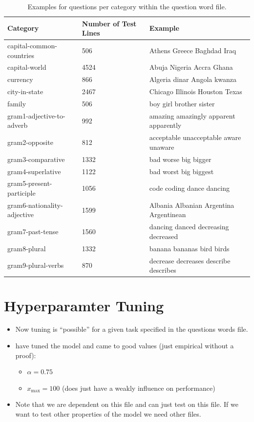 \begin{center}
\begin{table}
\begin{tabular}{ l | R{2.5cm} | l }
\hline
\textbf{Category} & \textbf{Number of Test Lines} & \textbf{Example}\\
\hline\hline
capital-common-countries & 506 & Athens Greece Baghdad Iraq\\
\hline
capital-world & 4524 & Abuja Nigeria Accra Ghana\\
\hline
currency & 866 & Algeria dinar Angola kwanza\\
\hline
city-in-state & 2467 & Chicago Illinois Houston Texas\\
\hline
family & 506 & boy girl brother sister\\
\hline
gram1-adjective-to-adverb & 992 & amazing amazingly apparent apparently\\
\hline
gram2-opposite & 812 & acceptable unacceptable aware unaware\\
\hline
gram3-comparative & 1332 & bad worse big bigger\\
\hline
gram4-superlative & 1122 & bad worst big biggest\\
\hline
gram5-present-participle & 1056 & code coding dance dancing\\
\hline
gram6-nationality-adjective & 1599 & Albania Albanian Argentina Argentinean\\
\hline
gram7-past-tense & 1560 & dancing danced decreasing decreased\\
\hline
gram8-plural & 1332 & banana bananas bird birds\\
\hline
gram9-plural-verbs & 870 & decrease decreases describe describes\\
\hline
\end{tabular}
\caption{Examples for questions per category within the question word file.}
\label{tab:qwfile}
\end{table}
\end{center}

\section{Hyperparamter Tuning}

\begin{itemize}
  \item 
    Now tuning is \enquote{possible} for a given task specified in the questions words file.

  \item 
    \cite{pennington2014glove} have tuned the model and came to good values (just 
    empirical without a proof):
    \begin{itemize}
      \item $\alpha = 0.75$
      \item $x_\mathrm{max} = 100$ (does just have a weakly influence on performance)
    \end{itemize}
    
  \item 
    Note that we are dependent on this file and can just test on this file. If 
    we want to test other properties of the model we need other files.
\end{itemize}
